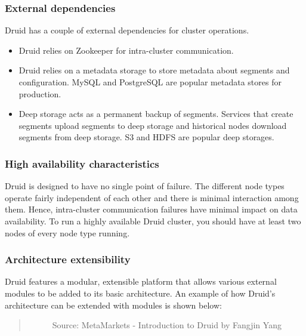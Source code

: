 \documentclass[letterpaper,10pt,english]{sphinxmanual}
\begin{document}
\subsubsection{External dependencies}
\label{\detokenize{discovery/part01/druid_nodes:external-dependencies}}\label{\detokenize{discovery/part01/druid_nodes:id2}}
Druid has a couple of external dependencies for cluster operations.
\begin{itemize}
\item {} 
 Druid relies on Zookeeper for intra-cluster communication.

\item {} 
 Druid relies on a metadata storage to store metadata about segments and configuration. MySQL and PostgreSQL are popular metadata stores for production.

\item {} 
 Deep storage acts as a permanent backup of segments. Services that create segments upload segments to deep storage and historical nodes download segments from deep storage. S3 and HDFS are popular deep storages.

\end{itemize}


\subsubsection{High availability characteristics}
\label{\detokenize{discovery/part01/druid_nodes:high-availability}}\label{\detokenize{discovery/part01/druid_nodes:id3}}
Druid is designed to have no single point of failure. The different node types operate fairly independent of each other and there is minimal interaction among them. Hence, intra-cluster communication failures have minimal impact on data availability. To run a highly available Druid cluster, you should have at least two nodes of every node type running.


\subsubsection{Architecture extensibility}
\label{\detokenize{discovery/part01/druid_nodes:extensionability}}\label{\detokenize{discovery/part01/druid_nodes:id4}}
Druid features a modular, extensible platform that allows various external modules to be added to its basic architecture. An example of how Druid’s architecture can be extended with modules is shown below:
\begin{quote}

\begin{figure}[H]
\centering
\capstart

\noindent{}
\caption{Source: MetaMarkets - Introduction to Druid by Fangjin Yang}\label{\detokenize{discovery/part01/druid_nodes:id8}}\end{figure}
\end{quote}
\end{document}
